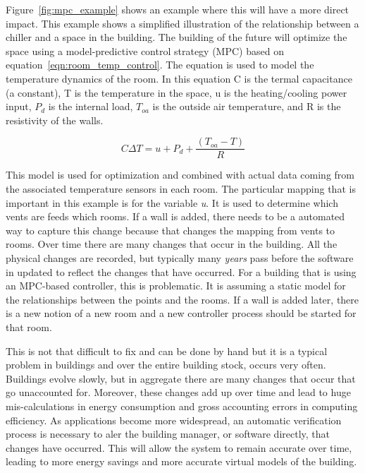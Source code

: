 Figure~\ref{fig:mpc_example} shows an example where this will have a more direct impact.  This example shows a simplified illustration
of the relationship between a chiller and a space in the building.  The building of the future will optimize the space using a 
model-predictive control strategy (MPC) based on equation~\ref{eqn:room_temp_control}.  The equation is used to model the temperature
dynamics of the room.  In this equation C is the termal capacitance (a constant), T is the temperature in the space, u is the heating/cooling
power input, $P_{d}$ is the internal load, $T_{oa}$ is the outside air temperature, and R is the resistivity of the walls.


\begin{equation}
\label{eqn:room_temp_control}
C \Delta T = u + P_d + \frac{(T_{oa} - T)}{R}
\end{equation}

This model is used for optimization and combined with actual data coming from the associated temperature sensors in each room.
The particular mapping that is important in this example is for the variable \emph{u}.  It is used to determine
which vents are feeds which rooms.  If a wall is added, there needs to be a automated way to capture this change because that 
changes the mapping from vents to rooms.
Over time there are many changes that occur in the building.
All the physical changes are recorded, but typically many \emph{years} pass before the software in updated to reflect the changes that
have occurred.  For a building that is using an MPC-based controller, this is problematic.  It is assuming a static model for the relationships
between the points and the rooms.  If a wall is added later, there is a new notion of a new room and a new controller process should be 
started for that room.

This is not that difficult to fix and can be done by hand but it is a typical problem in buildings and over the entire building stock, 
occurs very often.  Buildings evolve slowly, but in aggregate there are many changes that occur that go unaccounted for.  Moreover, these
changes add up over time and lead to huge mis-calculations in energy consumption and gross accounting errors in computing efficiency.
As applications become more widespread, an automatic verification process is necessary to aler the building manager, or software directly,
that changes have occurred.  This will allow the system to remain accurate over time, leading to more energy savings and more accurate
virtual models of the building.




